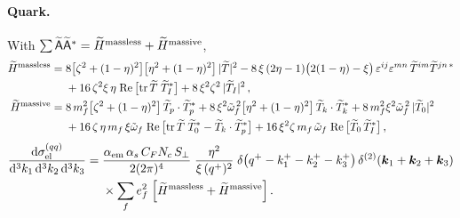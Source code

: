 \paragraph{Quark.} With $\sum\widetilde{\mathsf{A}}\widetilde{\mathsf{A}}^*=\widetilde H^{\rm massless}+\widetilde H^{\rm massive}$,
\begin{align}
\widetilde H^{\rm massless}={}&8\big[\zeta^2+(1-\eta)^2\big]\big[\eta^2+(1-\eta)^2\big]\,|\widetilde T|^2
-8\,\xi\,(2\eta-1)\big(2(1-\eta)-\xi\big)\,\varepsilon^{ij}\varepsilon^{mn}\,\widetilde T^{im}\widetilde T^{jn\,*}
\nonumber\\
&+16\,\zeta^2\xi\,\eta\;{\rm Re}\,\big[{\rm tr}\,\widetilde T\;\widetilde T_I^*\big]+8\,\xi^2\zeta^2\,|\widetilde T_I|^2\,,
\nonumber\\
\widetilde H^{\rm massive}={}&8\,m_f^2\big[\zeta^2+(1-\eta)^2\big]\,\widetilde T_p\cdot\widetilde T_p^*
+8\,\xi^2\tilde{\omega}_f^{\,2}\big[\eta^2+(1-\eta)^2\big]\,\widetilde T_k\cdot\widetilde T_k^*
+8\,m_f^2\xi^2\tilde{\omega}_f^{\,2}\,|\widetilde T_0|^2
\nonumber\\
&+16\,\zeta\,\eta\,m_f\,\xi\tilde{\omega}_f\;{\rm Re}\,\big[{\rm tr}\,\widetilde T\;\widetilde T_0^*-\widetilde T_k\cdot\widetilde T_p^*\big]
+16\,\xi^2\zeta\,m_f\,\tilde{\omega}_f\;{\rm Re}\,\big[\widetilde T_0\,\widetilde T_I^*\big]\,,
\label{eq:H-el-q}
\end{align}
\begin{align}
\frac{{\rm d}\sigma^{(qq)}_{\rm el}}{{\rm d}^3k_1\,{\rm d}^3k_2\,{\rm d}^3k_3}={}&
\frac{\alpha_{\rm em}\,\alpha_s\,C_FN_c\,S_\perp}{2(2\pi)^{4}}\;\frac{\eta^2}{\xi\,(q^+)^2}\;
\delta\big(q^+-k_1^+-k_2^+-k_3^+\big)\,\delta^{(2)}(\bm{k}_1+\bm{k}_2+\bm{k}_3)
\nonumber\\
&\times\sum_fe_f^2\;\Big[\widetilde H^{\rm massless}+\widetilde H^{\rm massive}\Big]\,.
\label{eq:xs-el-q}
\end{align}

